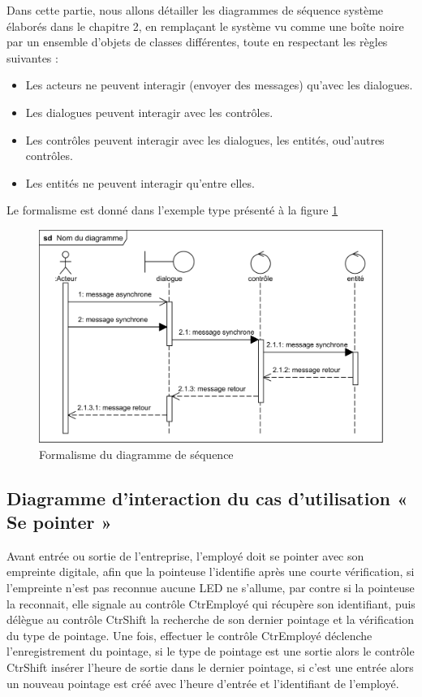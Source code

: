 Dans cette partie, nous allons détailler les diagrammes de séquence système 
élaborés dans le chapitre 2, en remplaçant le système vu comme une boîte 
noire par un ensemble d’objets de classes différentes, toute en respectant 
les règles suivantes :

\begin{itemize}
        \item[\textbullet] Les acteurs ne peuvent interagir (envoyer des messages) 
            qu’avec les dialogues.
        \item[\textbullet] Les dialogues peuvent interagir avec les contrôles. 
        \item[\textbullet] Les contrôles peuvent interagir avec les dialogues, les 
            entités, oud’autres contrôles.
        \item[\textbullet] Les entités ne peuvent interagir qu’entre elles.             
\end{itemize}

Le formalisme est donné dans l’exemple type présenté à la figure \ref{fig33}\\

\begin{figure}[h!]
    \centering                 
    \includegraphics[scale=1.23]{images/exemple ds.png}
    \caption{Formalisme du diagramme de séquence}
    \label{fig33}
\end{figure}

\clearpage
    
\subsection*{Diagramme d'interaction du cas d'utilisation « Se pointer »}
Avant entrée ou sortie de l’entreprise, l’employé doit se pointer avec son 
empreinte digitale, afin que la pointeuse l’identifie après une courte 
vérification, si l’empreinte n’est pas reconnue aucune LED ne s’allume, par 
contre si la pointeuse la reconnait, elle signale au contrôle CtrEmployé qui 
récupère son identifiant, puis délègue au contrôle CtrShift la recherche de son 
dernier pointage et la vérification du type de pointage. Une fois, effectuer le 
contrôle CtrEmployé déclenche l’enregistrement du pointage, si le type de 
pointage est une sortie alors le contrôle CtrShift insérer l’heure de sortie 
dans le dernier pointage, si c’est une entrée alors un nouveau pointage est 
créé avec l’heure d’entrée et l’identifiant de l’employé.

